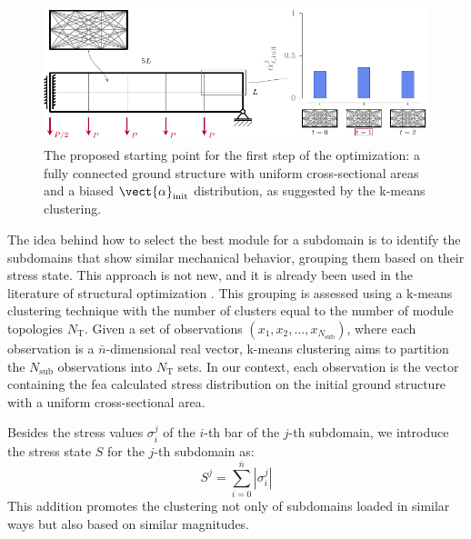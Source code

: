 \begin{figure}
    \centering
    \includegraphics{figures/06_DMO/00_x0/x0.pdf}
    \caption{The proposed starting point for the first step of the optimization: a fully connected ground structure with uniform cross-sectional areas and a biased $\vect{\alpha}_\text{init}$ distribution, as suggested by the k-means clustering.}
    \label{fig:06_x0}
\end{figure}

The idea behind how to select the best module for a subdomain is to identify the subdomains that show similar mechanical behavior, grouping them based on their stress state. This approach is not new, and it is already been used in the literature of structural optimization . This grouping is assessed using a k-means clustering technique with the number of clusters equal to the number of module topologies $N_\text{T}$. Given a set of observations $(x_1, x_2, ..., x_{N_\text{sub}})$, where each observation is a $\bar{n}$-dimensional real vector, k-means clustering aims to partition the $N_\text{sub}$ observations into $N_\text{T}$ sets. In our context, each observation is the vector containing the \acrfull{fea} calculated stress distribution on the initial ground structure with a uniform cross-sectional area.

Besides the stress values $\sigma_i^j$ of the $i$-th bar of the $j$-th subdomain, we introduce the stress state $S$ for the $j$-th subdomain as:
\begin{equation}
    S^j = \sum_{i=0}^{\bar{n}}|\sigma_i^j|
\end{equation}
This addition promotes the clustering not only of subdomains loaded in similar ways but also based on similar magnitudes.

